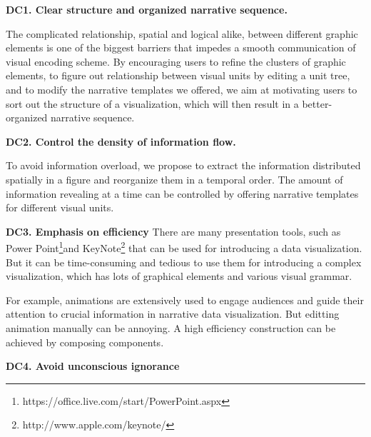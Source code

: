 \textbf{DC1. Clear structure and organized narrative sequence.}

The complicated relationship, spatial and logical alike,  between different graphic elements is one of the biggest barriers that impedes a smooth communication of visual encoding scheme. By encouraging users to refine the clusters of graphic elements, to figure out relationship between visual units by editing a unit tree, and to modify the narrative templates we offered, we aim at motivating users to sort out the structure of a visualization, which will then result in a better-organized narrative sequence. 

\textbf{DC2. Control the density of information flow.} 

To avoid information overload, we propose to extract the information distributed spatially in a  figure and reorganize them in a temporal order. The amount of information revealing at a time can be controlled by offering narrative templates for different visual units. 

\textbf{DC3. Emphasis on efficiency}
There are many presentation tools, such as Power Point\footnote{https://office.live.com/start/PowerPoint.aspx}and KeyNote\footnote{http://www.apple.com/keynote/} that can be used for introducing a data visualization. But it can be time-consuming and tedious to use them for introducing a complex visualization, which has lots of graphical elements and various visual grammar.

For example, animations are extensively used to engage audiences and guide their attention to crucial information in narrative data visualization.\cite{amini_authoring_2017, amini_understanding_2015} But editting animation manually can be annoying. A high efficiency construction can be achieved by composing components. \cite{bostock_protovis:_2009, huron_constructive_2014} 

\textbf{DC4. Avoid unconscious ignorance}

